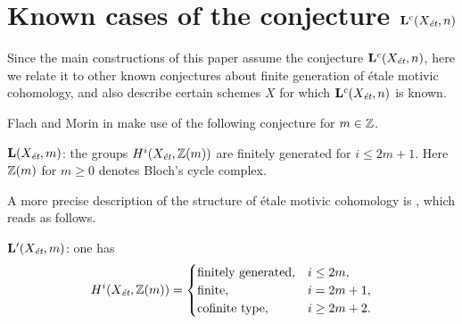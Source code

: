 \documentclass{article}
\numberwithin{equation}{section}
\begin{document}

\section{Known cases of the conjecture \texorpdfstring{$\mathbf{L}^c (X_\et,n)$}{L\textasciicircum c (X\_ét, n)}}
\label{sec:known-cases-of-Lc-Xet-n}

Since the main constructions of this paper assume the conjecture
$\mathbf{L}^c (X_\et,n)$, here we relate it to other known conjectures about
finite generation of étale motivic cohomology, and also describe certain schemes
$X$ for which $\mathbf{L}^c (X_\et,n)$ is known.

\vspace{1em}

Flach and Morin in \cite{Flach-Morin-2018} make use of the following conjecture
for $m \in \ZZ$.

\begin{conjecture}
  $\mathbf{L} (X_\et, m)$: the groups $H^i (X_\et, \ZZ (m))$ are finitely
  generated for $i \le 2m+1$. Here $\ZZ (m)$ for $m \ge 0$ denotes Bloch's cycle
  complex.
\end{conjecture}

A more precise description of the structure of étale motivic cohomology is
\cite[Conjecture~4.12]{Geisser-2017}, which reads as follows.

\begin{conjecture}
  $\mathbf{L}' (X_\et, m)$: one has
  \[ H^i (X_\et, \ZZ (m)) = \begin{cases}
      \text{finitely generated}, & i \le 2m, \\
      \text{finite}, & i = 2m + 1, \\
      \text{cofinite type}, & i \ge 2m + 2.
    \end{cases} \]
\end{conjecture}
\end{document}
